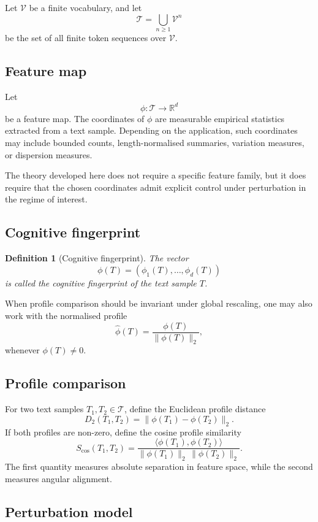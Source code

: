 \documentclass[11pt]{article}
\newtheorem{definition}{Definition}[section]
\begin{document}
Let $\mathcal{V}$ be a finite vocabulary, and let
\[
\mathcal{T} = \bigcup_{n \geq 1} \mathcal{V}^n
\]
be the set of all finite token sequences over $\mathcal{V}$.

\subsection{Feature map}

Let
\[
\phi : \mathcal{T} \to \mathbb{R}^d
\]
be a feature map. The coordinates of $\phi$ are measurable empirical statistics extracted from a text sample. Depending on the application, such coordinates may include bounded counts, length-normalised summaries, variation measures, or dispersion measures.

The theory developed here does not require a specific feature family, but it does require that the chosen coordinates admit explicit control under perturbation in the regime of interest.

\subsection{Cognitive fingerprint}

\begin{definition}[Cognitive fingerprint]
The vector
\[
\phi(T) = (\phi_1(T), \ldots, \phi_d(T))
\]
is called the \emph{cognitive fingerprint} of the text sample $T$.
\end{definition}

When profile comparison should be invariant under global rescaling, one may also work with the normalised profile
\[
\widehat{\phi}(T) = \frac{\phi(T)}{\|\phi(T)\|_2},
\]
whenever $\phi(T) \neq 0$.

\subsection{Profile comparison}

For two text samples $T_1, T_2 \in \mathcal{T}$, define the Euclidean profile distance
\[
D_2(T_1, T_2) = \|\phi(T_1) - \phi(T_2)\|_2.
\]
If both profiles are non-zero, define the cosine profile similarity
\[
S_{\cos}(T_1, T_2) = \frac{\langle \phi(T_1), \phi(T_2) \rangle}{\|\phi(T_1)\|_2\,\|\phi(T_2)\|_2}.
\]
The first quantity measures absolute separation in feature space, while the second measures angular alignment.

\subsection{Perturbation model}
\end{document}
